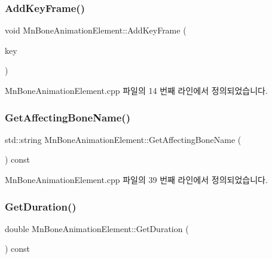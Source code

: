 \subsubsection{\texorpdfstring{Add\+Key\+Frame()}{AddKeyFrame()}}
{\footnotesize\ttfamily void Mn\+Bone\+Animation\+Element\+::\+Add\+Key\+Frame (\begin{DoxyParamCaption}\item[{const \hyperlink{struct_m_n_l_1_1_mn_bone_animation_key_frame}{Mn\+Bone\+Animation\+Key\+Frame} \&}]{key }\end{DoxyParamCaption})}



Mn\+Bone\+Animation\+Element.\+cpp 파일의 14 번째 라인에서 정의되었습니다.

\mbox{\label{class_m_n_l_1_1_mn_bone_animation_element_a7461a3a8bf2078d394db3a86c3a5eda6}} 
\subsubsection{\texorpdfstring{Get\+Affecting\+Bone\+Name()}{GetAffectingBoneName()}}
{\footnotesize\ttfamily std\+::string Mn\+Bone\+Animation\+Element\+::\+Get\+Affecting\+Bone\+Name (\begin{DoxyParamCaption}{ }\end{DoxyParamCaption}) const}



Mn\+Bone\+Animation\+Element.\+cpp 파일의 39 번째 라인에서 정의되었습니다.

\mbox{\label{class_m_n_l_1_1_mn_bone_animation_element_ad489dc7c72dea26d157a205d6af4fadb}} 
\subsubsection{\texorpdfstring{Get\+Duration()}{GetDuration()}}
{\footnotesize\ttfamily double Mn\+Bone\+Animation\+Element\+::\+Get\+Duration (\begin{DoxyParamCaption}{ }\end{DoxyParamCaption}) const}



